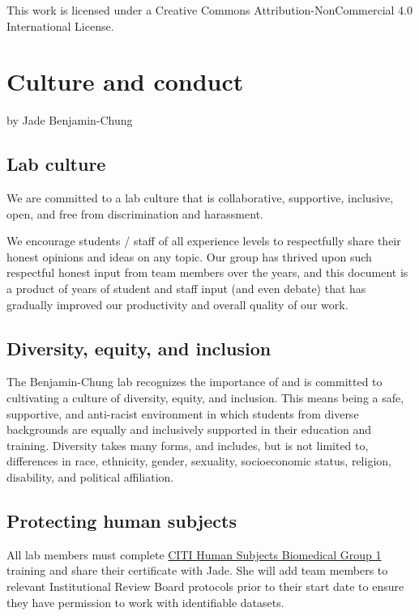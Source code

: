 \documentclass[
]{book}
\begin{document}
This work is licensed under a Creative Commons Attribution-NonCommercial 4.0 International License.

\chapter{Culture and conduct}\label{culture-and-conduct}

by Jade Benjamin-Chung

\section{Lab culture}\label{lab-culture}

We are committed to a lab culture that is collaborative, supportive, inclusive, open, and free from discrimination and harassment.

We encourage students / staff of all experience levels to respectfully share their honest opinions and ideas on any topic. Our group has thrived upon such respectful honest input from team members over the years, and this document is a product of years of student and staff input (and even debate) that has gradually improved our productivity and overall quality of our work.

\section{Diversity, equity, and inclusion}\label{diversity-equity-and-inclusion}

The Benjamin-Chung lab recognizes the importance of and is committed to cultivating a culture of diversity, equity, and inclusion. This means being a safe, supportive, and anti-racist environment in which students from diverse backgrounds are equally and inclusively supported in their education and training. Diversity takes many forms, and includes, but is not limited to, differences in race, ethnicity, gender, sexuality, socioeconomic status, religion, disability, and political affiliation.

\section{Protecting human subjects}\label{protecting-human-subjects}

All lab members must complete \href{https://researchcompliance.stanford.edu/panels/hs/forms/training/citi}{CITI Human Subjects Biomedical Group 1} training and share their certificate with Jade. She will add team members to relevant Institutional Review Board protocols prior to their start date to ensure they have permission to work with identifiable datasets.
\end{document}
